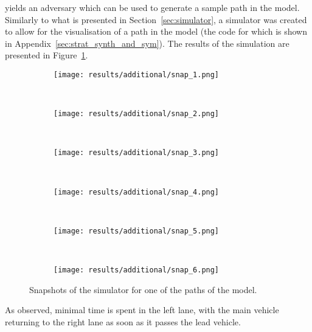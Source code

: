 yields an adversary which can be used to generate a sample path in the model. Similarly to what is presented in Section~\ref{sec:simulator}, a simulator was created to allow for the visualisation of a path in the model (the code for which is shown in Appendix~\ref{sec:strat_synth_and_sym}). The results of the simulation are presented in Figure~\ref{fig:lane_penalising_sim}.

\begin{figure}[H]
\centering
\begin{subfigure}{0.75\textwidth}
  \centering
  \texttt{[image: results/additional/snap\_1.png]}
\end{subfigure}\\ \vspace{2px}
\begin{subfigure}{0.75\textwidth}
  \centering
  \texttt{[image: results/additional/snap\_2.png]}
\end{subfigure} \\ \vspace{2px}
\begin{subfigure}{0.75\textwidth}
  \centering
  \texttt{[image: results/additional/snap\_3.png]}
\end{subfigure} \\ \vspace{2px}
\begin{subfigure}{0.75\textwidth}
  \centering
  \texttt{[image: results/additional/snap\_4.png]}
\end{subfigure} \\ \vspace{2px}
\begin{subfigure}{0.75\textwidth}
  \centering
  \texttt{[image: results/additional/snap\_5.png]}
\end{subfigure} \\ \vspace{2px}
\begin{subfigure}{0.75\textwidth}
  \centering
  \texttt{[image: results/additional/snap\_6.png]}
\end{subfigure}
\caption{Snapshots of the simulator for one of the paths of the model.}
\label{fig:lane_penalising_sim}
\end{figure}

As observed, minimal time is spent in the left lane, with the main vehicle returning to the right lane as soon as it passes the lead vehicle.

